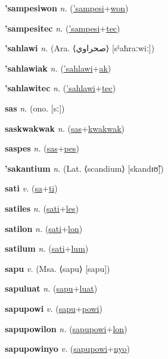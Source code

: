 \textbf{\hypertarget{'sampesiwon}{'sampesiwon}} \textit{n.} (\hyperlink{'sampesi}{'sampesi}+\allowbreak \hyperlink{won}{won})


\textbf{\hypertarget{'sampesitec}{'sampesitec}} \textit{n.} (\hyperlink{'sampesi}{'sampesi}+\allowbreak \hyperlink{tec}{tec})


\textbf{\hypertarget{'sahlawi}{'sahlawi}} \textit{n.} (Ara. ⟨{\arabics{}صحراوي}⟩ [sˤaħraːwiː])


\textbf{\hypertarget{'sahlawiak}{'sahlawiak}} \textit{n.} (\hyperlink{'sahlawi}{'sahlawi}+\allowbreak \hyperlink{ak}{ak})


\textbf{\hypertarget{'sahlawitec}{'sahlawitec}} \textit{n.} (\hyperlink{'sahlawi}{'sahlawi}+\allowbreak \hyperlink{tec}{tec})


\textbf{\hypertarget{sas}{sas}} \textit{n.} (ono. [sː])


\textbf{\hypertarget{saskwakwak}{saskwakwak}} \textit{n.} (\hyperlink{sas}{sas}+\allowbreak \hyperlink{kwakwak}{kwakwak})


\textbf{\hypertarget{saspes}{saspes}} \textit{n.} (\hyperlink{sas}{sas}+\allowbreak \hyperlink{pes}{pes})


\textbf{\hypertarget{'sakantium}{'sakantium}} \textit{n.} (Lat. ⟨scandium⟩ [skandɪʊ̃])


\textbf{\hypertarget{sati}{sati}} \textit{v.} (\hyperlink{sa}{sa}+\allowbreak \hyperlink{ti}{ti})


\textbf{\hypertarget{satiles}{satiles}} \textit{n.} (\hyperlink{sati}{sati}+\allowbreak \hyperlink{les}{les})


\textbf{\hypertarget{satilon}{satilon}} \textit{n.} (\hyperlink{sati}{sati}+\allowbreak \hyperlink{lon}{lon})


\textbf{\hypertarget{satilum}{satilum}} \textit{n.} (\hyperlink{sati}{sati}+\allowbreak \hyperlink{lum}{lum})


\textbf{\hypertarget{sapu}{sapu}} \textit{v.} (Msa. ⟨sapu⟩ [sapu])


\textbf{\hypertarget{sapuluat}{sapuluat}} \textit{n.} (\hyperlink{sapu}{sapu}+\allowbreak \hyperlink{luat}{luat})


\textbf{\hypertarget{sapupowi}{sapupowi}} \textit{v.} (\hyperlink{sapu}{sapu}+\allowbreak \hyperlink{powi}{powi})


\textbf{\hypertarget{sapupowilon}{sapupowilon}} \textit{n.} (\hyperlink{sapupowi}{sapupowi}+\allowbreak \hyperlink{lon}{lon})


\textbf{\hypertarget{sapupowinyo}{sapupowinyo}} \textit{v.} (\hyperlink{sapupowi}{sapupowi}+\allowbreak \hyperlink{nyo}{nyo})


